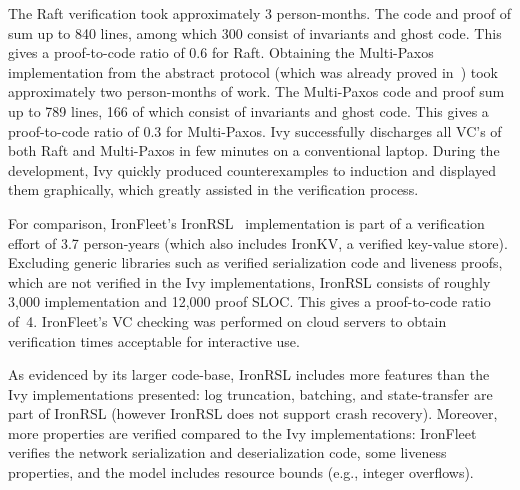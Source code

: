 The Raft verification took approximately 3 person-months.
The code and proof of sum up to 840 lines,
among which 300 consist of invariants and ghost code.
This gives a proof-to-code ratio of 0.6 for Raft.
%
Obtaining the Multi-Paxos implementation
from the abstract protocol (which was already proved in~\cite{oopsla17-epr}) took
approximately two person-months of work.
The Multi-Paxos code and proof sum up to 789 lines,
166 of which consist of invariants and ghost code.
This gives a proof-to-code ratio of 0.3 for Multi-Paxos.
%
Ivy successfully discharges all VC's of both Raft and Multi-Paxos in
few minutes on a conventional laptop. During the development, Ivy
quickly produced counterexamples to induction and displayed them
graphically, which greatly assisted in the verification process.


For comparison, IronFleet's IronRSL~\cite{IronFleet} implementation is
part of a verification effort of 3.7 person-years (which also includes
IronKV, a verified key-value store). Excluding generic libraries such
as verified serialization code and liveness proofs, which are not
verified in the Ivy implementations, IronRSL consists of roughly 3,000
implementation and 12,000 proof SLOC. This gives a proof-to-code
ratio of~4. IronFleet's VC checking was performed on cloud
servers to obtain verification times acceptable for interactive use.

As evidenced by its larger code-base, IronRSL includes more features than the Ivy implementations presented:
log truncation, batching, and state-transfer are part of IronRSL (however IronRSL does
not support crash recovery).  Moreover, more properties are verified
compared to the Ivy implementations: IronFleet verifies the network
serialization and deserialization code, some liveness properties, and
the model includes resource bounds (e.g., integer overflows).

